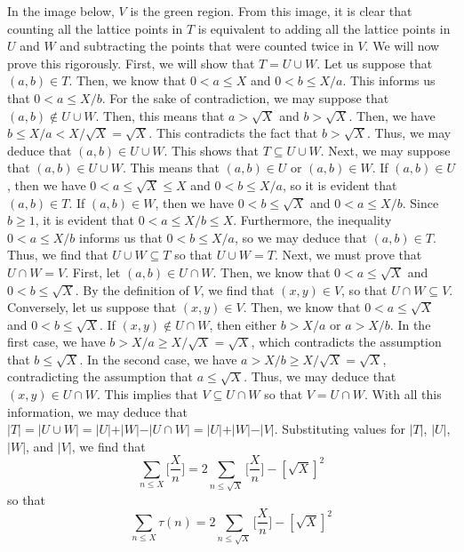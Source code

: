 \documentclass[12pt]{article}
\begin{document}
 In the image below, $V$ is the green region. From this image, it is clear that counting all the lattice points in $T$ is equivalent to adding all the lattice points in $U$ and $W$ and subtracting the points that were counted twice in $V$. We will now prove this rigorously. First, we will show that $T = U \cup W$. Let us suppose that $(a,b) \in T$. Then, we know that $0 < a \leq X$ and $0 < b \leq X/a$. This informs us that $0 < a \leq X/b$. For the sake of contradiction, we may suppose that $(a,b) \not \in U \cup W$. Then, this means that $a > \sqrt{X}$ and $b > \sqrt{X}$. Then, we have $b \leq X/a < X/\sqrt{X} = \sqrt{X}$. This contradicts the fact that $b > \sqrt{X}$. Thus, we may deduce that $(a,b) \in U \cup W$. This shows that $T \subseteq U \cup W$. Next, we may suppose that $(a,b) \in U \cup W$. This means that $(a,b) \in U$ or $(a,b) \in W$. If $(a,b) \in U$, then we have $0 < a \leq \sqrt{X} \leq X$ and $0 < b \leq X/a$, so it is evident that $(a,b) \in T$. If $(a,b) \in W$, then we have $0 < b \leq \sqrt{X}$ and $0 < a \leq X / b$. Since $b \geq 1$, it is evident that  $0 < a \leq X/b \leq X$. Furthermore, the inequality $0 < a \leq X/b$ informs us that $0 < b \leq X/a$, so we may deduce that $(a,b) \in T$. Thus, we find that $U \cup W \subseteq T$ so that $U \cup W = T$. Next, we must prove that $U \cap W = V$. First, let $(a,b) \in U \cap W$. Then, we know that $0 < a \leq \sqrt{X}$ and $0 < b \leq \sqrt{X}$. By the definition of $V$, we find that $(x,y) \in V$, so that $U \cap W \subseteq V$. Conversely, let us suppose that $(x,y) \in V$. Then, we know that $0 < a \leq \sqrt{X}$ and $0 < b \leq \sqrt{X}$. If $(x,y) \not \in U \cap W$, then either $b > X/a$ or $a > X/b$. In the first case, we have $b > X/a \geq X/\sqrt{X} = \sqrt{X}$, which contradicts the assumption that $b \leq \sqrt{X}$. In the second case, we have $a > X/b \geq X/\sqrt{X} = \sqrt{X}$, contradicting the assumption that $a \leq \sqrt{X}$. Thus, we may deduce that $(x,y) \in U \cap W$. This implies that $V \subseteq U \cap W$ so that $V = U \cap W$. With all this information, we may deduce that $\vert T \vert  = \vert U \cup W \vert = \vert U \vert + \vert W \vert - \vert U \cap W \vert = \vert U \vert + \vert W \vert - \vert V \vert$. Substituting values for $\vert T \vert$, $\vert U \vert$, $\vert W \vert$, and $\vert V \vert$, we find that
\[
\sum_{n\leq X} \bigg[\frac{X}{n}\bigg] = 2 \sum_{n \leq \sqrt{X}} \bigg[\frac{X}{n}\bigg] - [\sqrt{X}]^2 
\] so that
\[
\sum_{n \leq X} \tau(n) = 2 \sum_{n \leq \sqrt{X}} \bigg[\frac{X}{n}\bigg] - [\sqrt{X}]^2
\]
\end{document}
